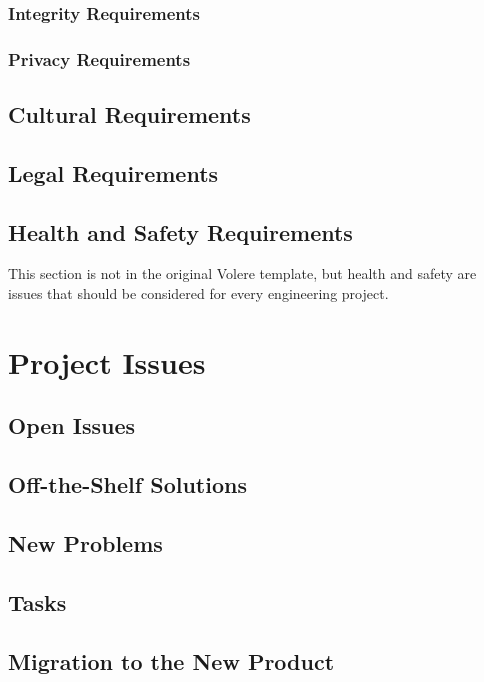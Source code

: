 \documentclass[12pt, titlepage]{article}
\begin{document}
\subsubsection{Integrity Requirements}

\subsubsection{Privacy Requirements}

\subsection{Cultural Requirements}

\subsection{Legal Requirements}

\subsection{Health and Safety Requirements}

This section is not in the original Volere template, but health and safety are
issues that should be considered for every engineering project.

\section{Project Issues}

\subsection{Open Issues}

\subsection{Off-the-Shelf Solutions}

\subsection{New Problems}

\subsection{Tasks}

\subsection{Migration to the New Product}
\end{document}
